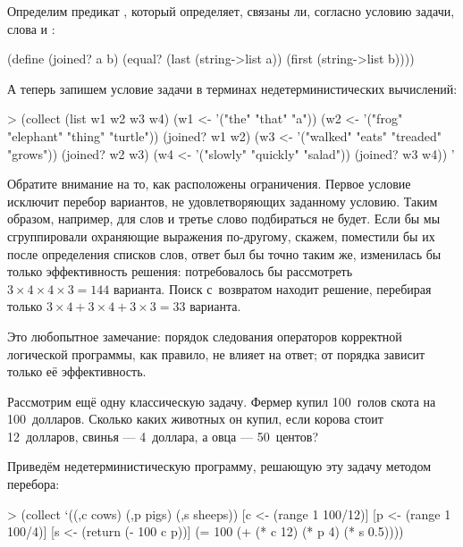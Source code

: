 Определим предикат , который определяет, связаны ли, согласно условию задачи, слова  и :
\begin{SchemeCode}[emph={a,b}]
(define (joined? a b)
  (equal? (last (string->list a)) 
          (first (string->list b))))
\end{SchemeCode}

А теперь запишем условие задачи в терминах недетерминистических вычислений:

\begin{SchemeCode}[emph={w1,w2,w3,w4}]
> (collect (list w1 w2 w3 w4)
    (w1 <- '("the" "that" "a"))
    (w2 <- '("frog" "elephant" "thing" "turtle"))
    (joined? w1 w2)
    (w3 <- '("walked" "eats" "treaded" "grows"))
    (joined? w2 w3)
    (w4 <- '("slowly" "quickly" "salad"))
    (joined? w3 w4))%
'%
\end{SchemeCode}

Обратите внимание на то, как расположены ограничения. Первое условие  исключит перебор вариантов, не удовлетворяющих заданному условию. Таким образом, например, для слов  и  третье слово подбираться не будет. Если бы мы сгруппировали охраняющие выражения по-другому, скажем, поместили бы их после определения списков слов, ответ был бы точно таким же, изменилась бы только эффективность решения: потребовалось бы рассмотреть $3\times4\times4\times3=144$ варианта. Поиск с~возвратом находит решение, перебирая только $3\times4+3\times4+3\times3=33$ варианта.

Это любопытное замечание: порядок следования операторов корректной логической программы, как правило, не влияет на ответ; от порядка зависит только её эффективность.

Рассмотрим ещё одну классическую задачу. Фермер купил 100~голов скота на 100~долларов. Сколько каких животных он купил, если корова стоит 12~долларов, свинья --- 4~доллара, а овца --- 50~центов?

Приведём недетерминистическую программу, решающую эту задачу методом перебора:

\begin{SchemeCode}[emph={c,p,s}]
   > (collect `((,c cows) (,p pigs) (,s sheeps))
      [c <- (range 1 100/12)]
      [p <- (range 1 100/4)]
      [s <- (return (- 100 c p))]
      (= 100 (+ (* c 12) (* p 4) (* s 0.5))))
\end{SchemeCode}

